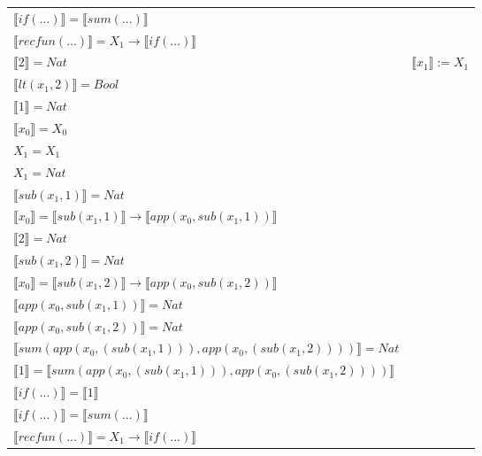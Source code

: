 \begin{exercise}
\begin{description}
\begin{center}
\begin{longtable}[!h]{ | l | l | }
                        $ \llbracket if(...) \rrbracket =  \llbracket sum(...) \rrbracket$ & \\
                        $ \llbracket recfun(...) \rrbracket =   X_1  \to  \llbracket if(...) \rrbracket $  & \\
                      \hline
                        $ \llbracket 2 \rrbracket = Nat$  & $ \llbracket x_1 \rrbracket := X_1$ \\
                        $ \llbracket lt(x_1 , 2) \rrbracket = Bool$ & \\
                        $ \llbracket 1 \rrbracket = Nat$ & \\
                        $ \llbracket x_0 \rrbracket = X_0$ & \\
                        $X_1 = X_1$ & \\
                        $X_1 = Nat$ & \\
                        $ \llbracket sub(x_1,1) \rrbracket = Nat$ & \\
                        $ \llbracket x_0 \rrbracket =  \llbracket sub(x_1,1) \rrbracket \to  \llbracket app(x_0, sub(x_1,1)) \rrbracket$ & \\
                        $ \llbracket 2 \rrbracket = Nat$ & \\
                        $ \llbracket sub(x_1,2) \rrbracket = Nat$ & \\
                        $ \llbracket x_0 \rrbracket =  \llbracket sub(x_1,2) \rrbracket \to  \llbracket app(x_0, sub(x_1,2)) \rrbracket$ & \\
                        $ \llbracket app(x_0, sub(x_1,1)) \rrbracket = Nat$ & \\
                        $ \llbracket app(x_0, sub(x_1,2)) \rrbracket = Nat$ & \\
                        $ \llbracket sum(app(x_0, (sub(x_1,1))), app(x_0, (sub(x_1,2))))  \rrbracket = Nat$ & \\
                        $ \llbracket 1 \rrbracket =  \llbracket sum(app(x_0, (sub(x_1,1))), app(x_0, (sub(x_1,2)))) \rrbracket$ & \\
                        $ \llbracket if(...) \rrbracket =  \llbracket 1 \rrbracket$ & \\
                        $ \llbracket if(...) \rrbracket =  \llbracket sum(...) \rrbracket$ & \\
                        $ \llbracket recfun(...) \rrbracket =   X_1  \to  \llbracket if(...) \rrbracket $  & \\

\end{longtable}
\end{center}
\end{description}
\end{exercise}
